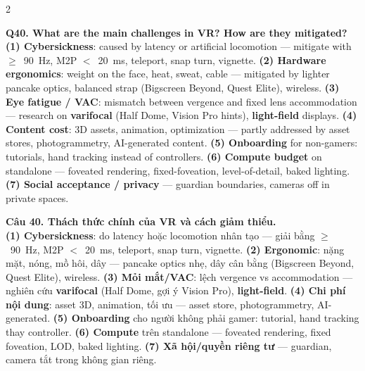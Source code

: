 \begin{paracol}{2}
\switchcolumn*

\textbf{Q40. What are the main challenges in VR? How are they mitigated?}\\
\textbf{(1) Cybersickness}: caused by latency or artificial locomotion --- mitigate with $\geq$~90~Hz, M2P $<$~20~ms, teleport, snap turn, vignette. \textbf{(2) Hardware ergonomics}: weight on the face, heat, sweat, cable --- mitigated by lighter pancake optics, balanced strap (Bigscreen Beyond, Quest Elite), wireless. \textbf{(3) Eye fatigue / VAC}: mismatch between vergence and fixed lens accommodation --- research on \textbf{varifocal} (Half Dome, Vision Pro hints), \textbf{light-field} displays. \textbf{(4) Content cost}: 3D assets, animation, optimization --- partly addressed by asset stores, photogrammetry, AI-generated content. \textbf{(5) Onboarding} for non-gamers: tutorials, hand tracking instead of controllers. \textbf{(6) Compute budget} on standalone --- foveated rendering, fixed-foveation, level-of-detail, baked lighting. \textbf{(7) Social acceptance / privacy} --- guardian boundaries, cameras off in private spaces.

\switchcolumn

\textbf{Câu 40. Thách thức chính của VR và cách giảm thiểu.}\\
\textbf{(1) Cybersickness}: do latency hoặc locomotion nhân tạo --- giải bằng $\geq$~90~Hz, M2P $<$~20~ms, teleport, snap turn, vignette. \textbf{(2) Ergonomic}: nặng mặt, nóng, mồ hôi, dây --- pancake optics nhẹ, dây cân bằng (Bigscreen Beyond, Quest Elite), wireless. \textbf{(3) Mỏi mắt/VAC}: lệch vergence vs accommodation --- nghiên cứu \textbf{varifocal} (Half Dome, gợi ý Vision Pro), \textbf{light-field}. \textbf{(4) Chi phí nội dung}: asset 3D, animation, tối ưu --- asset store, photogrammetry, AI-generated. \textbf{(5) Onboarding} cho người không phải gamer: tutorial, hand tracking thay controller. \textbf{(6) Compute} trên standalone --- foveated rendering, fixed foveation, LOD, baked lighting. \textbf{(7) Xã hội/quyền riêng tư} --- guardian, camera tắt trong không gian riêng.

\switchcolumn*


\end{paracol}
